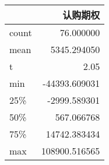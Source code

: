 \begin{tabular}{lr}
\toprule
{} &             认购期权 \\
\midrule
count &      76.000000 \\
mean  &    5345.294050 \\
t   &   2.05 \\
min   &  -44393.609031 \\
25\%   &   -2999.589301 \\
50\%   &     567.066768 \\
75\%   &   14742.383434 \\
max   &  108900.516565 \\
\bottomrule
\end{tabular}
